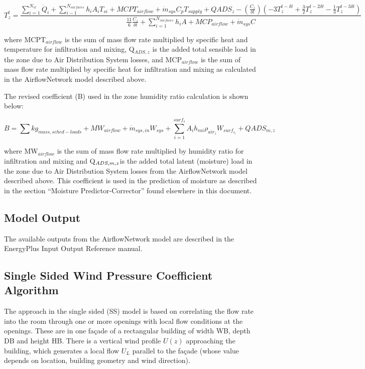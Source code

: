 {\scriptsize
\begin{equation}
T_z^t = \frac{\sum_{i=1}^{N_{sl}} \dot{Q}_i + \sum_{i-1}^{N_{surfaces}} h_i A_i T_{si} + MCPT_{airflow} + \dot{m}_{sys} C_p T_{supply} + QADS_z - \left( \frac{C_z}{\delta t} \right ) \left(-3 T_z^{t-\delta t} + \frac{3}{2} T_z^{t-2\delta t} -\frac{1}{3} T_z^{t-3\delta t} \right )}{\frac{11}{6} \frac{C_z}{\delta t} + \sum_{i=1}^{N_{surfaces}} h_i A + MCP_{airflow} + \dot{m}_{sys} C}
\end{equation}}

where MCPT\(_{airflow}\) is the sum of mass flow rate multiplied by specific heat and temperature for infiltration and mixing, Q\(_{ADS,z}\) is the added total sensible load in the zone due to Air Distribution System losses, and MCP\(_{airflow}\) is the sum of mass flow rate multiplied by specific heat for infiltration and mixing as calculated in the AirflowNetwork model described above.

The revised coefficient (B) used in the zone humidity ratio calculation is shown below:

\begin{equation}
B = \sum kg_{mass,sched-loads} + MW_{airflow} + \dot{m}_{sys,in} W_{sys} + \sum_{i = 1}^{surf_s} A_i h_{mi} \rho_{air_z} W_{surf_{s_i}} + QADS_{m,z}
\end{equation}

where MW\(_{airflow}\) is the sum of mass flow rate multiplied by humidity ratio for infiltration and mixing and Q\(_{ADS,m,z\\}\)is the added total latent (moisture) load in the zone due to Air Distribution System losses from the AirflowNetwork model described above. This coefficient is used in the prediction of moisture as described in the section ``Moisture Predictor-Corrector'' found elsewhere in this document.

\subsection{Model Output}\label{model-output}

The available outputs from the AirflowNetwork model are described in the EnergyPlus Input Output Reference manual.

\subsection{Single Sided Wind Pressure Coefficient Algorithm}

The approach in the single sided (SS) model is based on correlating the flow rate into
the room through one or more openings with local flow conditions at the openings. These
are in one fa\c{c}ade of a rectangular building of width WB, depth DB and height HB.
There is a vertical wind profile $U(z)$ approaching the building, which generates a
local flow $U_L$ parallel to the fa\c{c}ade (whose value depends on location, building
geometry and wind direction).

